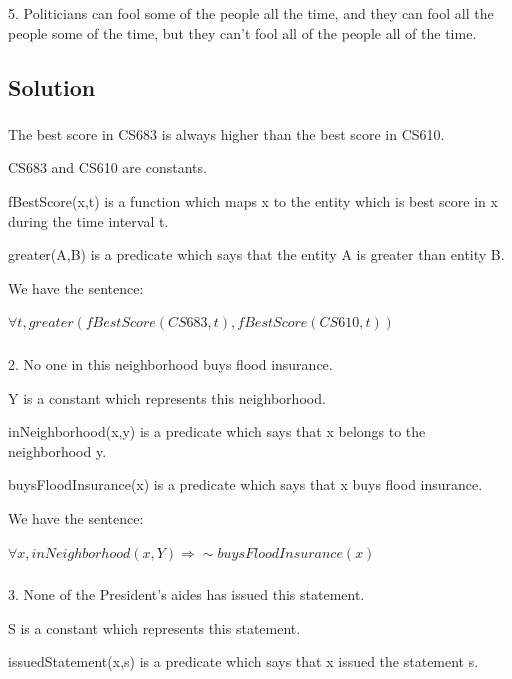 \documentclass[a4paper,10pt]{article}
\begin{document}
   5. Politicians can fool some of the people all the time, and they can fool all the people some of the time, but they can't fool all of the people all of the time. 

\subsection{Solution}

\subsubsection{}

The best score in CS683 is always higher than the best score in CS610.

CS683 and CS610 are constants.

fBestScore(x,t) is a function which maps x to the entity which is best score in x during the time interval t.

greater(A,B) is a predicate which says that the entity A is greater than entity B.

We have the sentence:

$ \forall t, greater(fBestScore(CS683,t),fBestScore(CS610,t)) $


\subsubsection{}

2. No one in this neighborhood buys flood insurance.

Y is a constant which represents this neighborhood.

inNeighborhood(x,y) is a predicate which says that x belongs to the neighborhood y.

buysFloodInsurance(x) is a predicate which says that x buys flood insurance.

We have the sentence:

$\forall x, inNeighborhood(x,Y) \Rightarrow \sim buysFloodInsurance(x)$

\subsubsection{}

3. None of the President's aides has issued this statement.

S is a constant which represents this statement.

issuedStatement(x,s) is a predicate which says that x issued the statement s.
\end{document}
